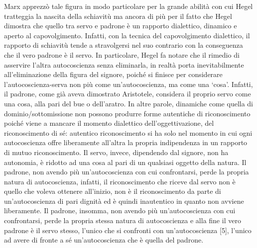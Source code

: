\documentclass[a4paper,12pt,oneside,openany]{book}%
\begin{document}
	Marx apprezzò tale figura in modo particolare per la grande abilità con cui Hegel tratteggia la nascita della schiavitù ma ancora di più per il fatto che Hegel dimostra che quello tra servo e padrone è un rapporto dialettico, dinamico e aperto al capovolgimento. Infatti, con la tecnica del capovolgimento dialettico, il rapporto di schiavitù tende a stravolgersi nel suo contrario con la conseguenza che il vero padrone è il servo. In particolare, Hegel fa notare che il rimedio di asservire l’altra autocoscienza senza eliminarla, in realtà porta inevitabilmente all’eliminazione della figura del signore, poiché si finisce per considerare l’autocoscienza-serva non più come un’autocoscienza, ma come una ‘cosa’. Infatti, il padrone, come già aveva dimostrato Aristotele, considera il proprio servo come una cosa, alla pari del bue o dell’aratro. In altre parole, dinamiche come quella di dominio/sottomissione non possono produrre forme autentiche di riconoscimento poiché viene a mancare il momento dialettico dell’oggettivazione, del riconoscimento di sé: autentico riconoscimento si ha solo nel momento in cui ogni autocoscienza offre liberamente all’altra la propria indipendenza in un rapporto di mutuo riconoscimento. Il servo, invece, dipendendo dal signore, non ha autonomia, è ridotto ad una cosa al pari di un qualsiasi oggetto della natura. Il padrone, non avendo più un’autocoscienza con cui confrontarsi, perde la propria natura di autocoscienza, infatti, il riconoscimento che riceve dal servo non è quello che voleva ottenere all’inizio, non è il riconoscimento da parte di un’autocoscienza di pari dignità ed è quindi inautentico in quanto non avviene liberamente. Il padrone, insomma, non avendo più un’autocoscienza con cui confrontarsi, perde la propria stessa natura di autocoscienza e alla fine il vero padrone è il servo stesso, l’unico che si confronti con un’autocoscienza [5], l’unico ad avere di fronte a sé un’autocoscienza che è quella del padrone.
	
\end{document}
